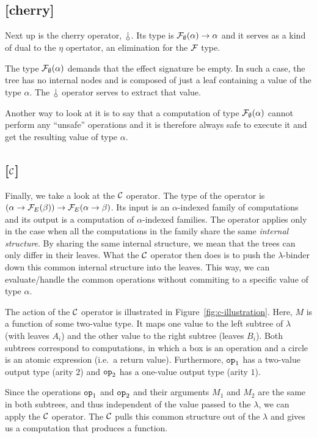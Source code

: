 \subsection*{[cherry]}

Next up is the cherry operator, $\cherry$. Its type is
$\mathcal{F}_\emptyset(\alpha) \to \alpha$ and it serves as a kind of dual to the
$\eta$ opertator, an elimination for the $\mathcal{F}$ type.

The type $\mathcal{F}_\emptyset(\alpha)$ demands that the effect signature be
empty. In such a case, the tree has no internal nodes and is composed of
just a leaf containing a value of the type $\alpha$. The $\cherry$ operator
serves to extract that value.

Another way to look at it is to say that a computation of type
$\mathcal{F}_\emptyset(\alpha)$ cannot perform any ``unsafe'' operations and it is
therefore always safe to execute it and get the resulting value of type
$\alpha$.

\subsection*{[$\mathcal{C}$]}

Finally, we take a look at the $\mathcal{C}$ operator. The type of the operator is
$(\alpha \to \mathcal{F}_E(\beta)) \to \mathcal{F}_E(\alpha \to \beta)$. Its input is an
$\alpha$-indexed family of computations and its output is a computation of
$\alpha$-indexed families. The operator applies only in the case when all
the computations in the family share the same \emph{internal structure}. By
sharing the same internal structure, we mean that the trees can only differ
in their leaves. What the $\mathcal{C}$ operator then does is to push the
$\lambda$-binder down this common internal structure into the leaves. This
way, we can evaluate/handle the common operations without commiting to a
specific value of type $\alpha$.

The action of the $\mathcal{C}$ operator is illustrated in
Figure~\ref{fig:c-illustration}. Here, $M$ is a function of some two-value
type. It maps one value to the left subtree of $\lambda$ (with leaves
$A_i$) and the other value to the right subtree (leaves $B_i$). Both
subtrees correspond to computations, in which a box is an operation and a
circle is an atomic expression (i.e.\ a return value). Furthermore,
$\mathtt{op}_1$ has a two-value output type (arity $2$) and $\mathtt{op}_2$ has a
one-value output type (arity $1$).

Since the operations $\mathtt{op}_1$ and $\mathtt{op}_2$ and their arguments $M_1$
and $M_2$ are the same in both subtrees, and thus independent of the value
passed to the $\lambda$, we can apply the $\mathcal{C}$ operator. The $\mathcal{C}$ pulls
this common structure out of the $\lambda$ and gives us a computation that
produces a function.

